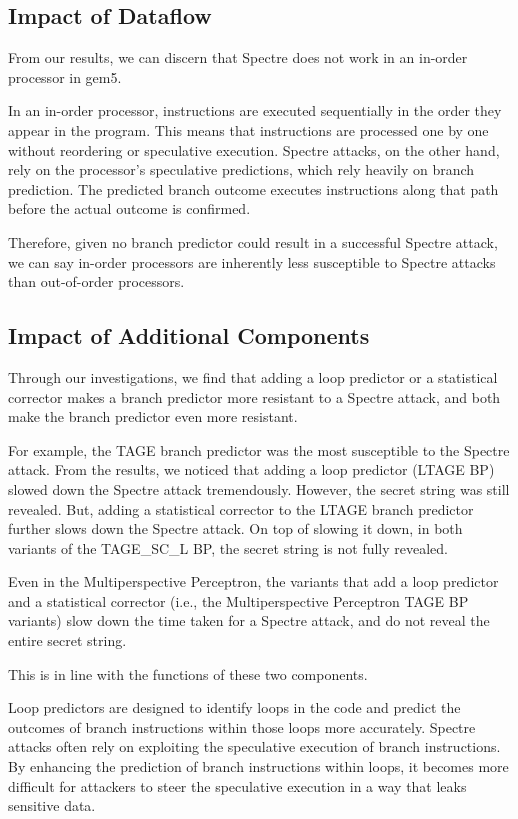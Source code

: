 \documentclass[twocolumn,showpacs,%
  nofootinbib,aps,superscriptaddress,%
  eqsecnum,prd,notitlepage,showkeys,10pt]{revtex4-1}
\begin{document}
\subsection{Impact of Dataflow}
From our results, we can discern that Spectre does not work in an in-order processor in gem5.

In an in-order processor, instructions are executed sequentially in the order they appear in the program. This means that instructions are processed one by one without reordering or speculative execution. Spectre attacks, on the other hand, rely on the processor's speculative predictions, which rely heavily on branch prediction. The predicted branch outcome executes instructions along that path before the actual outcome is confirmed.

Therefore, given no branch predictor could result in a successful Spectre attack, we can say in-order processors are inherently less susceptible to Spectre attacks than out-of-order processors.

\subsection{Impact of Additional Components}
Through our investigations, we find that adding a loop predictor or a statistical corrector makes a branch predictor more resistant to a Spectre attack, and both make the branch predictor even more resistant.

For example, the TAGE branch predictor was the most susceptible to the Spectre attack. From the results, we noticed that adding a loop predictor (LTAGE BP) slowed down the Spectre attack tremendously. However, the secret string was still revealed. But, adding a statistical corrector to the LTAGE branch predictor further slows down the Spectre attack. On top of slowing it down, in both variants of the TAGE\_SC\_L BP, the secret string is not fully revealed.

Even in the Multiperspective Perceptron, the variants that add a loop predictor and a statistical corrector (i.e., the Multiperspective Perceptron TAGE BP variants) slow down the time taken for a Spectre attack, and do not reveal the entire secret string.

This is in line with the functions of these two components.

Loop predictors are designed to identify loops in the code and predict the outcomes of branch instructions within those loops more accurately. Spectre attacks often rely on exploiting the speculative execution of branch instructions. By enhancing the prediction of branch instructions within loops, it becomes more difficult for attackers to steer the speculative execution in a way that leaks sensitive data.
\end{document}
